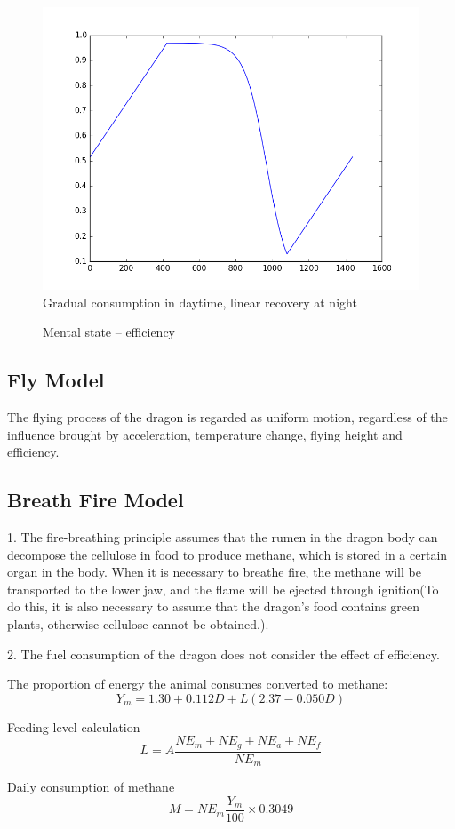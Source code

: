 \begin{figure}[htbp]
    \centering
    \includegraphics[width=.5\textwidth]{figures/attri/spirit.png}\\
    Gradual consumption in daytime, linear recovery at night
    \caption{Mental state -- efficiency }
    \label{fig:spirit}
\end{figure}

\subsection{Fly Model}

The flying process of the dragon is regarded as uniform motion, regardless of the influence brought by acceleration, temperature change, flying height and efficiency.


\subsection{Breath Fire Model}

1. The fire-breathing principle assumes that the rumen in the dragon body can decompose the cellulose in food to produce methane, which is stored in a certain organ in the body. When it is necessary to breathe fire, the methane will be transported to the lower jaw, and the flame will be ejected through ignition(To do this, it is also necessary to assume that the dragon's food contains green plants, otherwise cellulose cannot be obtained.).

2. The fuel consumption of the dragon does not consider the effect of efficiency.

The proportion of energy the animal consumes converted to methane: \cite{CH4proportion}
\begin{equation*}
Y_m = 1.30+0.112D+L(2.37-0.050D)
\end{equation*}

Feeding level calculation
\[
L=A\frac{NE_m+NE_g+NE_a+NE_f}{NE_m}
\]

 
Daily consumption of methane
\[
M = NE_m\frac{Y_m}{100}\times 0.3049
\]
    
